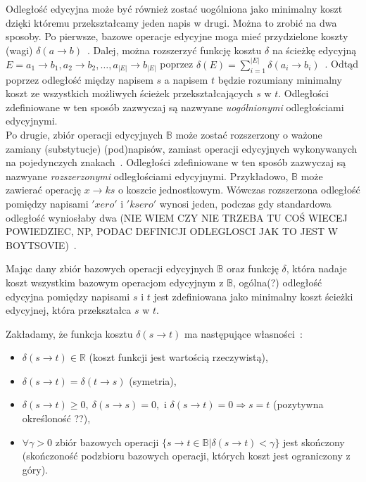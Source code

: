 \documentclass{praca1}
\begin{document}
Odległość edycyjna może być również zostać uogólniona jako minimalny koszt dzięki któremu przekształcamy jeden napis w drugi. Można to zrobić na dwa sposoby. Po pierwsze, bazowe operacje edycyjne moga mieć przydzielone koszty (wagi) $\delta(a \rightarrow b)$~\cite{Wagner1974:stringtostring}. Dalej, można rozszerzyć funkcję kosztu $\delta$ na ścieżkę edycyjną $E = a_1 \rightarrow b_1, a_2 \rightarrow b_2, \ldots, a_{|E|} \rightarrow b_{|E|}$ poprzez $\delta(E) = \sum\limits_{i=1}^{|E|}\delta(a_i \rightarrow b_i)$~\cite{Boytsov2011:indexingmethods}. Odtąd poprzez odległość między napisem $s$ a napisem $t$ będzie rozumiany minimalny koszt ze wszystkich możliwych ścieżek przekształcających $s$ w $t$. Odległości zdefiniowane w ten sposób zazwyczaj są nazwyane \emph{uogólnionymi} odległościami edycyjnymi.\\
Po drugie, zbiór operacji edycyjnych $\mathbb{B}$ może zostać rozszerzony o ważone zamiany (substytucje) (pod)napisów, zamiast operacji edycyjnych wykonywanych na pojedynczych znakach~\cite{Ukkonen1985:algorithmsforapprox}. Odległości zdefiniowane w ten sposób zazwyczaj są nazwyane \emph{rozszerzonymi} odległościami edycyjnymi. Przykładowo, $\mathbb{B}$ może zawierać operację $x \rightarrow ks$ o koszcie jednostkowym. Wówczas rozszerzona odległość pomiędzy napisami $'xero'$ i $'ksero'$ wynosi jeden, podczas gdy standardowa odległość wyniosłaby dwa (NIE WIEM CZY NIE TRZEBA TU COŚ WIECEJ POWIEDZIEC, NP, PODAC DEFINICJI ODLEGLOSCI JAK TO JEST W BOYTSOVIE)~\cite{Boytsov2011:indexingmethods}.

\begin{definition}\label{def:002}
Mając dany zbiór bazowych operacji edycyjnych $\mathbb{B}$ oraz funkcję $\delta$, która nadaje koszt wszystkim bazowym operacjom edycyjnym z $\mathbb{B}$, ogólna(?) odległość edycyjna pomiędzy napisami $s$ i $t$ jest zdefiniowana jako minimalny koszt ścieżki edycyjnej, która przekształca $s$ w $t$\cite{Boytsov2011:indexingmethods}.
\end{definition}

\begin{property}\label{wl:002}
Zakładamy, że funkcja kosztu $\delta(s \rightarrow t)$ ma następujące własności~\cite{Boytsov2011:indexingmethods}:
\begin{itemize}
\item $\delta(s \rightarrow t) \in \mathbb{R}$ (koszt funkcji jest wartością rzeczywistą),
\item $\delta(s \rightarrow t) = \delta(t \rightarrow s)$ (symetria),
\item $\delta(s \rightarrow t) \geq 0,\ \delta(s \rightarrow s) = 0,\text{ i } \delta(s \rightarrow t) = 0 \Rightarrow s = t$ (pozytywna określoność ??),
\item $\forall \gamma > 0$ zbiór bazowych operacji $\{s \rightarrow t \in \mathbb{B} | \delta(s \rightarrow t) < \gamma \}$ jest skończony (skończoność podzbioru bazowych operacji, których koszt jest ograniczony z góry).
\end{itemize}
\end{property}
\end{document}
